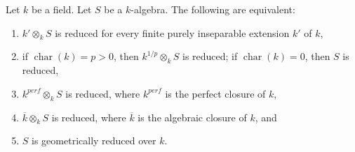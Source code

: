 \begin{lemma}
\label{editorial-source-lemma-geometrically-reduced-finite-purely-inseparable-extension}
Let $k$ be a field. Let $S$ be a $k$-algebra.
The following are equivalent:
\begin{enumerate}
\item $k' \otimes_k S$ is reduced for every finite
purely inseparable extension $k'$ of $k$,
\item if $\operatorname{char}(k)=p>0$, then
$k^{1/p}\otimes_k S$ is reduced; if
$\operatorname{char}(k)=0$, then $S$ is reduced,
\item $k^{perf} \otimes_k S$ is reduced, where $k^{perf}$ is the
perfect closure of $k$,
\item $\overline{k} \otimes_k S$ is reduced, where $\overline{k}$ is the
algebraic closure of $k$, and
\item $S$ is geometrically reduced over $k$.
\end{enumerate}
\end{lemma}

